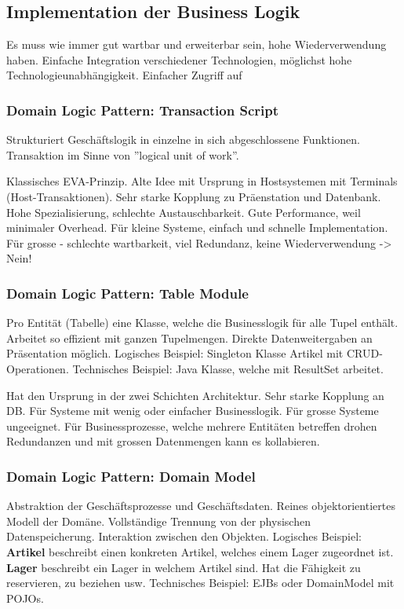 \subsection{Implementation der Business Logik}
Es muss wie immer gut wartbar und erweiterbar sein, hohe Wiederverwendung haben. Einfache Integration verschiedener Technologien, möglichst hohe Technologieunabhängigkeit. Einfacher Zugriff auf 

\subsubsection{Domain Logic Pattern: Transaction Script}
Strukturiert Geschäftslogik in einzelne in sich abgeschlossene Funktionen. Transaktion im Sinne von ''logical unit of work''.

Klassisches EVA-Prinzip. Alte Idee mit Ursprung in Hostsystemen mit Terminals (Host-Transaktionen). Sehr starke Kopplung zu Präenstation und Datenbank. Hohe Spezialisierung, schlechte Austauschbarkeit. Gute Performance, weil minimaler Overhead. Für kleine Systeme, einfach und schnelle Implementation. Für grosse - schlechte wartbarkeit, viel Redundanz, keine Wiederverwendung -> Nein!

\subsubsection{Domain Logic Pattern: Table Module}
Pro Entität (Tabelle) eine Klasse, welche die Businesslogik für alle Tupel enthält. Arbeitet so effizient mit ganzen Tupelmengen. Direkte Datenweitergaben an Präsentation möglich. Logisches Beispiel: Singleton Klasse Artikel mit CRUD-Operationen. Technisches Beispiel: Java Klasse, welche mit ResultSet arbeitet.

Hat den Ursprung in der zwei Schichten Architektur. Sehr starke Kopplung an DB. Für Systeme mit wenig oder einfacher Businesslogik. Für grosse Systeme ungeeignet. Für Businessprozesse, welche mehrere Entitäten betreffen drohen Redundanzen und mit grossen Datenmengen kann es kollabieren.

\subsubsection{Domain Logic Pattern: Domain Model}
Abstraktion der Geschäftsprozesse und Geschäftsdaten. Reines objektorientiertes Modell der Domäne. Vollständige Trennung von der physischen Datenspeicherung. Interaktion zwischen den Objekten. Logisches Beispiel: \textbf{Artikel} beschreibt einen konkreten Artikel, welches einem Lager zugeordnet ist. \textbf{Lager} beschreibt ein Lager in welchem Artikel sind. Hat die Fähigkeit zu reservieren, zu beziehen usw.
Technisches Beispiel: EJBs oder DomainModel mit POJOs.

